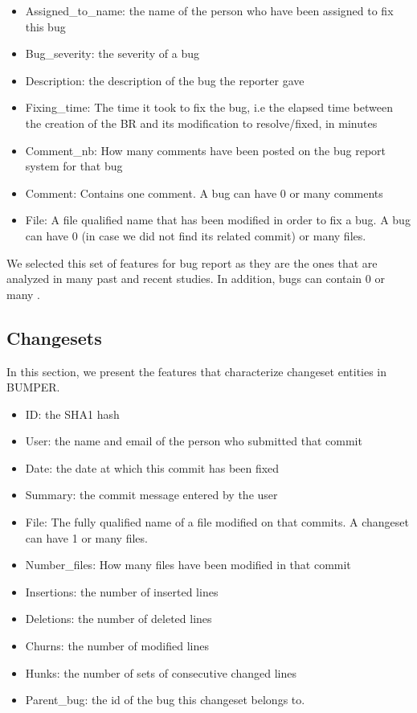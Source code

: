 \begin{itemize}
\item Assigned\_to\_name: the name of the person who have been assigned to fix this bug
\item Bug\_severity: the severity of a bug
\item Description: the description of the bug the reporter gave
\item Fixing\_time: The time it took to fix the bug, i.e the elapsed time between the creation of the BR and its modification to resolve/fixed, in minutes
\item Comment\_nb: How many comments have been posted on the bug report system for that bug
\item Comment: Contains one comment. A bug can have 0 or many comments
\item File: A file qualified name that has been modified in order to fix a bug. A bug can have 0 (in case we did not find its related commit) or many files.

\end{itemize}

We selected this set of features for bug report as they are the ones that are analyzed in many past and recent studies. In addition, bugs can contain 0 or many .

\subsection{Changesets}

In this section, we present the features that characterize changeset entities in BUMPER.

\begin{itemize}

\item ID: the SHA1 hash
\item User: the name and email of the person who submitted that commit
\item Date: the date at which this commit has been fixed
\item Summary: the commit message entered by the user
\item File: The fully qualified name of a file modified on that commits. A changeset can have 1 or many files.
\item Number\_files: How many files have been modified in that commit
\item Insertions: the number of inserted lines
\item Deletions: the number of deleted lines
\item Churns: the number of modified lines
\item Hunks: the number of sets of consecutive changed lines
\item Parent\_bug: the id of the bug this changeset belongs to.

\end{itemize}

